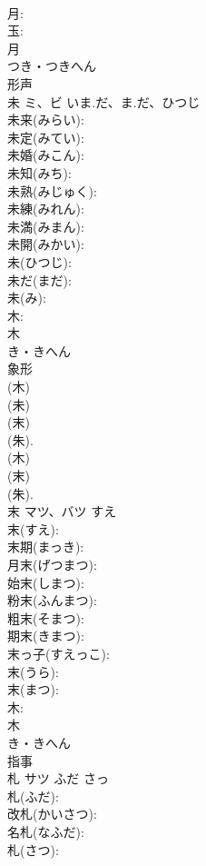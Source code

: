 \documentclass[8pt]{extreport}
\begin{document}
\begin{CJK}{UTF8}{min}
\\	月: 
\\	玉: 
\\	月	
\\	つき・つきへん	
\\	形声 
\\	未	ミ、ビ	いま.だ、ま.だ、ひつじ		
\\	未来(みらい): 
\\	未定(みてい): 
\\	未婚(みこん): 
\\	未知(みち): 
\\	未熟(みじゅく): 
\\	未練(みれん): 
\\	未満(みまん): 
\\	未開(みかい): 
\\	未(ひつじ): 
\\	未だ(まだ): 
\\	未(み): 
\\	木: 
\\	木	
\\	き・きへん	
\\	象形 
\\	(木) 
\\	(未) 
\\	(末) 
\\	(朱).	
\\	(木) 
\\	(末) 
\\	(朱).
\\	末	マツ、バツ	すえ		
\\	末(すえ): 
\\	末期(まっき): 
\\	月末(げつまつ): 
\\	始末(しまつ): 
\\	粉末(ふんまつ): 
\\	粗末(そまつ): 
\\	期末(きまつ): 
\\	末っ子(すえっこ): 
\\	末(うら): 
\\	末(まつ): 
\\	木: 
\\	木	
\\	き・きへん	
\\	指事 
\\	札	サツ	ふだ	さっ	
\\	札(ふだ): 
\\	改札(かいさつ): 
\\	名札(なふだ): 
\\	札(さつ): 

\end{CJK}
\end{document}
